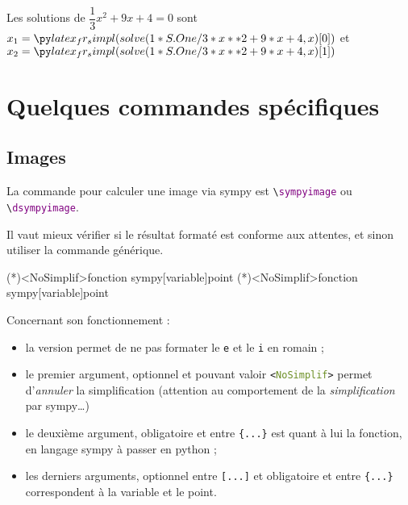 \documentclass[french,a4paper,11pt]{article}
\newcommand\Cle[1]{{\bfseries\sffamily\textlangle #1\textrangle}}
\newcommand\cmaj[1]{\tcbox[vignetteMaJ]{#1}\xspace}
\begin{document}
\begin{bloctext}
Les solutions de $\dfrac13x^2+9x+4=0$ sont
$x_1 = \dsympycalc{solve(1/3*x**2+9*x+4,x)[0]}$ et
$x_2 = \dsympycalc{solve(1/3*x**2+9*x+4,x)[1]}$
\end{bloctext}

\section{Quelques commandes spécifiques}

\subsection{Images}

\begin{cautionblock}
\cmaj{0.1.1} La commande pour calculer une image via \textsf{sympy} est \texttt{\textbackslash \textcolor{purple}{sympyimage}} ou \texttt{\textbackslash \textcolor{purple}{dsympyimage}}.

Il vaut mieux vérifier si le résultat formaté est conforme aux attentes, et sinon utiliser la commande générique.
\end{cautionblock}

\begin{bloctext}
\sympyimage(*)<NoSimplif>{fonction sympy}[variable]{point}
\dsympyimage(*)<NoSimplif>{fonction sympy}[variable]{point}
\end{bloctext}

\begin{tipblock}
Concernant son fonctionnement :

\begin{itemize}
	\item la version \Cle{*} permet de ne pas formater le \texttt{e} et le \texttt{i} en \textsf{romain} ;
	\item le premier argument, optionnel et pouvant valoir \texttt{<\textcolor{OliveDrab}{NoSimplif}>} permet d'\textit{annuler} la simplification (attention au comportement de la \textit{simplification} par \textsf{sympy}\ldots)
	\item le deuxième argument, obligatoire et entre \texttt{\{...\}} est quant à lui la fonction, en langage \textsf{sympy} à passer en \textsf{python} ;
	\item les derniers arguments, optionnel entre \texttt{[...]} et obligatoire et entre \texttt{\{...\}} correspondent à la variable et le point.
\end{itemize}
\vspace*{-\baselineskip}\leavevmode
\end{tipblock}
\end{document}
